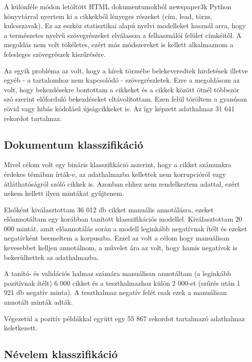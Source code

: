 A különféle módon letöltött HTML dokumentumokból newspaper3k \cite{newspaper3k} Python könyvtárral nyertem ki a cikkekből lényeges részeket (cím, lead, törzs, kulcsszavak). Ez az eszköz statisztikai alapú nyelvi modelleket használ arra, hogy a természetes nyelvű szövegrészeket elválassza a felhasználói felület címkéitől. A megoldás nem volt tökéletes, ezért más módszereket is kellett alkalmaznom a felesleges szövegrészek kiszűrésére.

Az egyik probléma az volt, hogy a hírek törzsébe belekeveredtek hirdetések illetve egyéb - a tartalomhoz nem kapcsolódó - szövegrészletek. Erre a megoldásom az volt, hogy bekezdésekre bontottam a cikkeket és a cikkek között ötnél többször szó szerint előforduló bekezdéseket eltávolítottam. Ezen felül töröltem a gyanúsan rövid vagy hibás kódolású újságcikkeket is. Az így képzett adathalmaz 31 641 rekordot tartalmaz.

\subsection{Dokumentum klasszifikáció}

Mivel célom volt egy bináris klasszifikáció aszerint, hogy a cikket számunkra érdekes témában írták-e, az adathalmazba kellettek nem korrupcióról vagy átláthatóságról szóló cikkek is. Azonban ehhez nem rendelkeztem adattal, ezért nekem kellett ilyen mintákat gyűjtenem.

Elsőként kiválasztottam 36 012 db cikket manuális annotálásra, ezeket előannotáltam egy korábban tanított klasszifikációs modellel. Kiválasztottam 20 000 mintát, amit előannotálás során a modell leginkább negatívnak ítélt és ezeket negatívként beemeltem a korpuszba. Ezzel az volt a célom hogy manuálisan kevesebbet kelljen annotálnom, a művelet ára az volt, hogy hamis negatívok is bekerülhettek az adathalmazba.

A tanító- és validációs halmaz számára manuálisan annotáltam (a leginkább pozitívnak ítélt) 6 000 cikket és a teszthalmazhoz külön 2 000-et (szűrés után 1 921 db negatív minta). A teszthalmaz negatív felét csak ezek a manuálisan annotált minták adták.

Végezetül a pozitív példákkal együtt egy 55 867 rekordot tartalmazó adathalmaz keletkezett.

\subsection{Névelem klasszifikáció}

